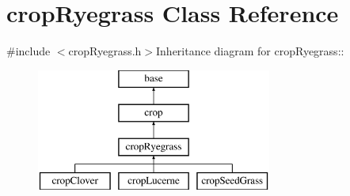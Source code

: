 \hypertarget{classcrop_ryegrass}{
\section{cropRyegrass Class Reference}
\label{classcrop_ryegrass}
}


{\ttfamily \#include $<$cropRyegrass.h$>$}Inheritance diagram for cropRyegrass::\begin{figure}[H]
\begin{center}
\leavevmode
\includegraphics[height=4cm]{classcrop_ryegrass}
\end{center}
\end{figure}
